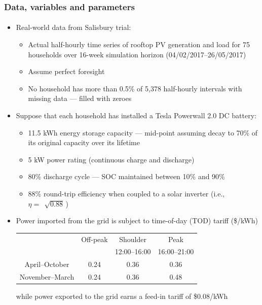 \documentclass[presentation, smaller, xcolor=table]{beamer}
\newcommand{\sqrts}[2][]{\,\sqrt[#1]{#2}\,}
\begin{document}
\begin{frame}
	\frametitle{Data, variables and parameters}
	\framesubtitle{}

	\begin{itemize}
		\item  Real-world data from Salisbury trial:
		\begin{itemize}
			\item  Actual half-hourly time series of rooftop PV generation and load for 75 households over 16-week simulation horizon (04/02/2017--26/05/2017)
			\item  Assume perfect foresight
			\item  No household has more than 0.5\% of 5,378 half-hourly intervals with missing data --- filled with zeroes
		\end{itemize}
		
		\item  Suppose that each household has installed a Tesla Powerwall 2.0 DC battery:
		\begin{itemize}
			\item  11.5 kWh energy storage capacity --- mid-point assuming decay to 70\% of its original capacity over its lifetime
			\item  5 kW power rating (continuous charge and discharge)
			\item  80\% discharge cycle --- SOC maintained between 10\% and 90\%
			\item  88\% round-trip efficiency when coupled to a solar inverter (i.e., $\eta = \sqrts{0.88}$)
		\end{itemize}
		\item  Power imported from the grid is subject to time-of-day (TOD) tariff (\$/kWh)
			\begin{table}[!h]
			\centering
			{\scriptsize
			\begin{tabular}{c c c c}
				\toprule
				& Off-peak	& Shoulder	& Peak	\\
				&	& 12:00--16:00	& 16:00--21:00	\\
				\midrule
				April--October	& 0.24	& 0.36	& 0.36	\\
				November--March	& 0.24	& 0.36	& 0.48	\\
				\bottomrule
			\end{tabular}
			}
			\end{table}
		while power exported to the grid earns a feed-in tariff of \$0.08/kWh
	
	\end{itemize}

\end{frame}
\end{document}
